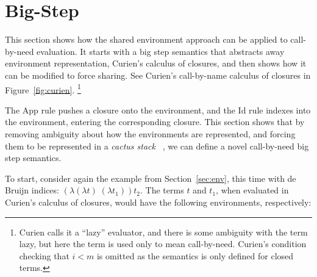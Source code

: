 \section{Big-Step \ce} \label{sec:calc}

This section shows how the shared environment approach can be applied to
call-by-need evaluation. It starts with a big step semantics that abstracts away
environment representation, Curien's calculus of closures, and then shows how it
can be modified to force sharing. See Curien's call-by-name calculus of closures
in Figure~\ref{fig:curien}. \footnote{Curien calls it a ``lazy'' evaluator, and
there is some ambiguity with the term lazy, but here the term is used only to
mean call-by-need. Curien's condition checking that $i < m$ is omitted as the
semantics is only defined for closed terms.}

The App rule pushes a closure onto the environment, and the Id rule indexes into
the environment, entering the corresponding closure. This section shows that by
removing ambiguity about how the environments are represented, and forcing them
to be represented in a \emph{cactus stack} ~\cite{stenstrom1988vlsi}, we can
define a novel call-by-need big step semantics.

To start, consider again the example from Section~\ref{sec:env}, this time with
de Bruijn indices: $(\lambda(\lambda t) \; (\lambda t_1)) t_2$.  The terms $t$
and $t_1$, when evaluated in Curien's calculus of closures, would have the
following environments, respectively: 

\begin{center}
\end{center}

